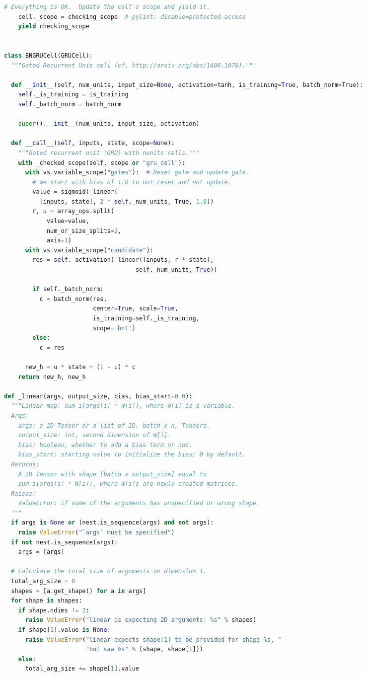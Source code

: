\begin{landscape}
\begin{multicols}{2}
\begin{lstlisting}[language=Python]
    # Everything is OK.  Update the cell's scope and yield it.
    cell._scope = checking_scope  # pylint: disable=protected-access
    yield checking_scope


class BNGRUCell(GRUCell):
  """Gated Recurrent Unit cell (cf. http://arxiv.org/abs/1406.1078)."""

  def __init__(self, num_units, input_size=None, activation=tanh, is_training=True, batch_norm=True):
    self._is_training = is_training
    self._batch_norm = batch_norm

    super().__init__(num_units, input_size, activation)

  def __call__(self, inputs, state, scope=None):
    """Gated recurrent unit (GRU) with nunits cells."""
    with _checked_scope(self, scope or "gru_cell"):
      with vs.variable_scope("gates"):  # Reset gate and update gate.
        # We start with bias of 1.0 to not reset and not update.
        value = sigmoid(_linear(
          [inputs, state], 2 * self._num_units, True, 1.0))
        r, u = array_ops.split(
            value=value,
            num_or_size_splits=2,
            axis=1)
      with vs.variable_scope("candidate"):
        res = self._activation(_linear([inputs, r * state],
                                     self._num_units, True))

        if self._batch_norm:
          c = batch_norm(res,
                         center=True, scale=True,
                         is_training=self._is_training,
                         scope='bn1')
        else:
          c = res

      new_h = u * state + (1 - u) * c
    return new_h, new_h

def _linear(args, output_size, bias, bias_start=0.0):
  """Linear map: sum_i(args[i] * W[i]), where W[i] is a variable.
  Args:
    args: a 2D Tensor or a list of 2D, batch x n, Tensors.
    output_size: int, second dimension of W[i].
    bias: boolean, whether to add a bias term or not.
    bias_start: starting value to initialize the bias; 0 by default.
  Returns:
    A 2D Tensor with shape [batch x output_size] equal to
    sum_i(args[i] * W[i]), where W[i]s are newly created matrices.
  Raises:
    ValueError: if some of the arguments has unspecified or wrong shape.
  """
  if args is None or (nest.is_sequence(args) and not args):
    raise ValueError("`args` must be specified")
  if not nest.is_sequence(args):
    args = [args]

  # Calculate the total size of arguments on dimension 1.
  total_arg_size = 0
  shapes = [a.get_shape() for a in args]
  for shape in shapes:
    if shape.ndims != 2:
      raise ValueError("linear is expecting 2D arguments: %s" % shapes)
    if shape[1].value is None:
      raise ValueError("linear expects shape[1] to be provided for shape %s, "
                       "but saw %s" % (shape, shape[1]))
    else:
      total_arg_size += shape[1].value


\end{lstlisting}
\end{multicols}
\end{landscape}
